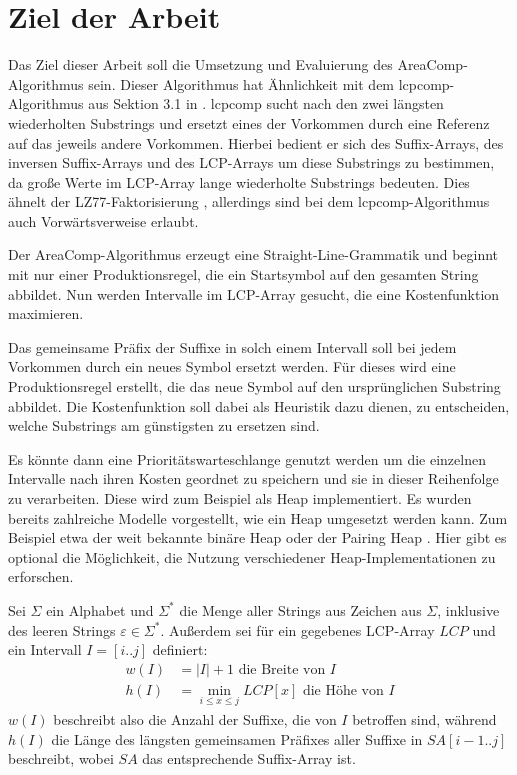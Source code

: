 \chapter{Ziel der Arbeit}

Das Ziel dieser Arbeit soll die Umsetzung und Evaluierung des AreaComp-Algorithmus sein. Dieser Algorithmus hat Ähnlichkeit mit dem lcpcomp-Algorithmus aus Sektion 3.1 in \cite{dinklage_compression_2017}.
lcpcomp sucht nach den zwei längsten wiederholten Substrings und ersetzt eines der Vorkommen durch eine Referenz auf das jeweils andere Vorkommen.
Hierbei bedient er sich des Suffix-Arrays, des inversen Suffix-Arrays und des LCP-Arrays \cite{manber_suffix_1993} um diese Substrings zu bestimmen, da große Werte im LCP-Array lange wiederholte Substrings bedeuten. Dies ähnelt der LZ77-Faktorisierung \cite{ziv_universal_1977}, allerdings sind bei dem lcpcomp-Algorithmus auch Vorwärtsverweise erlaubt.

Der AreaComp-Algorithmus erzeugt eine Straight-Line-Grammatik und beginnt mit nur einer Produktionsregel, die ein Startsymbol auf den gesamten String abbildet.
Nun werden Intervalle im LCP-Array gesucht, die eine Kostenfunktion maximieren. 

Das gemeinsame Präfix der Suffixe in solch einem Intervall soll bei jedem Vorkommen durch ein neues Symbol ersetzt werden. Für dieses wird eine Produktionsregel erstellt, die das neue Symbol auf den ursprünglichen Substring abbildet. Die Kostenfunktion soll dabei als Heuristik dazu dienen, zu entscheiden, welche Substrings am günstigsten zu ersetzen sind.

Es könnte dann eine Prioritätswarteschlange genutzt werden um die einzelnen Intervalle nach ihren Kosten geordnet zu speichern und sie in dieser Reihenfolge zu verarbeiten. 
Diese wird zum Beispiel als Heap implementiert. Es wurden bereits zahlreiche Modelle vorgestellt, wie ein Heap umgesetzt werden kann. Zum Beispiel etwa der weit bekannte binäre Heap \cite{williams_algorithm_1964} oder der Pairing Heap \cite{fredman_pairing_1986}. Hier gibt es optional die Möglichkeit, die Nutzung verschiedener Heap-Implementationen \cite{larkin_back--basics_2013} zu erforschen.

Sei $\Sigma$ ein Alphabet und $\Sigma^*$ die Menge aller Strings aus Zeichen aus $\Sigma$, inklusive des leeren Strings $\varepsilon \in \Sigma^*$. Außerdem sei für ein gegebenes LCP-Array $LCP$ und ein Intervall $I = [i..j]$ definiert:
\begin{align*}
    w(I) &= |I| + 1 \text{ die Breite von $I$}\\
    h(I) &= \min_{i \leq x \leq j} LCP[x] \text{ die Höhe von $I$} 
\end{align*}
$w(I)$ beschreibt also die Anzahl der Suffixe, die von $I$ betroffen sind, während $h(I)$ die Länge des längsten gemeinsamen Präfixes aller Suffixe in $SA[i - 1..j]$ beschreibt, wobei $SA$ das entsprechende Suffix-Array ist.

